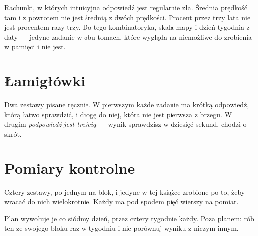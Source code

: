 Rachunki, w których intuicyjna odpowiedź jest regularnie zła. Średnia prędkość
tam i z powrotem nie jest średnią z dwóch prędkości. Procent przez trzy lata
nie jest procentem razy trzy. Do tego kombinatoryka, skala mapy i dzień
tygodnia z daty — jedyne zadanie w obu tomach, które wygląda na niemożliwe do
zrobienia w pamięci i nie jest.



\chapter{Łamigłówki}

Dwa zestawy pisane ręcznie. W pierwszym każde zadanie ma krótką odpowiedź,
którą łatwo sprawdzić, i drogę do niej, która nie jest pierwsza z brzegu.
W drugim \emph{podpowiedź jest treścią} — wynik sprawdzisz w dziesięć sekund,
chodzi o skrót.



\chapter{Pomiary kontrolne}

Cztery zestawy, po jednym na blok, i jedyne w tej książce zrobione po to, żeby
wracać do nich wielokrotnie. Każdy ma pod spodem pięć wierszy na pomiar.

Plan wywołuje je co siódmy dzień, przez cztery tygodnie każdy. Poza planem: rób
ten ze swojego bloku raz w tygodniu i nie porównuj wyniku z niczym innym.


